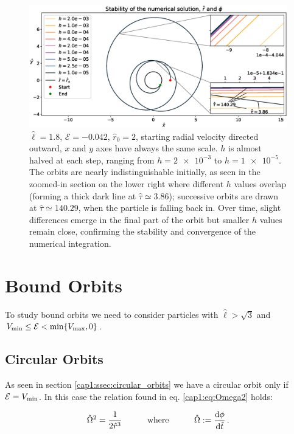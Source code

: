 \begin{figure}[h]
    \centering
    \includegraphics[width=\textwidth]{Figures/chapter2/stability_infall2.eps}
    \caption{$\hat \ell = 1.8$, $\mathcal E = -0.042$, $\hat r_0 = 2$, starting
    radial velocity directed outward, $x$ and $y$ axes have always the same
    scale.
    $h$ is almost halved at each step, ranging from $h = \num{2e-3}$ to
    $h = \num{1e-5}$.
    The orbits are nearly indistinguishable initially, as seen in the zoomed-in
    section on the lower right where different $h$ values overlap (forming a
    thick dark line at $\hat \tau \simeq 3.86$); successive orbits are drawn
    at $\hat \tau \simeq 140.29$, when the particle is falling back in.
    Over time, slight differences emerge in the final part of the orbit but
    smaller $h$ values remain close, confirming the stability and convergence of
    the numerical integration.}
    \label{cap2:fig:stability_infall2}
\end{figure}


\section{Bound Orbits}

To study bound orbits we need to consider particles with $\hat \ell > \sqrt{3}$
and $V_{\rm min} \leq \mathcal E < \min \{V_{\rm max}, 0\}$.

\subsection{Circular Orbits}

As seen in section \ref{cap1:ssec:circular_orbits} we have a circular orbit only
if $\mathcal E = V_{\rm min}$.
In this case the relation found in eq. \ref{cap1:eq:Omega2} holds:

\begin{equation}
    \hat \Omega^2 = \frac{1}{2 \hat r^3}
    \quad \quad \quad {\rm where} \quad \quad \quad
    \hat \Omega := \dv{\phi}{\hat t} \, .
    \label{cap2:eq:Omega2}
\end{equation}

